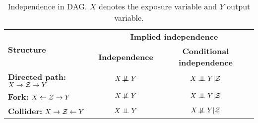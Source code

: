 \vspace{.5cm}
\begin{table}[h]
    \centering
    \begin{tabular}{l|c|c}
        \hline\hline
        \multirow{2}{2cm}{\textbf{Structure}}
         &
        \multicolumn{2}{c}{\textbf{Implied independence}} \\
        \cline{2-3}
        &
        \textbf{Independence}
        &
        \textbf{Conditional independence}
        \\
        \hline\hline
        \wrap{\textbf{Directed path:} \\
        $X\rightarrow\mathcal{Z}\rightarrow Y$}
        &
        $X\not\!\perp \!\!\! \perp Y$
        &
        $X\perp \!\!\! \perp Y | \mathcal{Z}$
        \\
        \hline
        \wrap{\textbf{Fork:} \\
        $X\leftarrow\mathcal{Z}\rightarrow Y$}
        &
        $X\not\!\perp \!\!\! \perp Y$
        &
        $X\perp \!\!\! \perp Y | \mathcal{Z}$
        \\
        \hline
        \wrap{\textbf{Collider:} \\
        $X\rightarrow\mathcal{Z}\leftarrow Y$}
        &
        $X\perp \!\!\! \perp Y$
        &
        $X\not\!\perp \!\!\! \perp Y | \mathcal{Z}$ \\
        \hline\hline
    \end{tabular}
    \caption{Independence in DAG. $X$ denotes the exposure variable and $Y$ output variable.}
    \label{tab:independence}
\end{table}
\vspace{.5cm}

